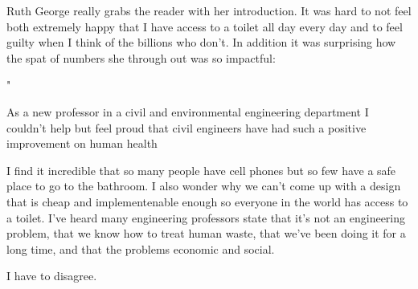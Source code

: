 Ruth George really grabs the reader with her introduction.  It was hard to not feel both extremely happy that I have access to a toilet all day every day and to feel guilty when I think of the billions who don't.  In addition it was surprising how the spat of numbers she through out was so impactful:

	"

As a new professor in a civil and environmental engineering department I couldn't help but feel proud that civil engineers have had such a positive improvement on human health

I find it incredible that so many people have cell phones but so few have a safe place to go to the bathroom. I also wonder why we can't come up with a design that is cheap and implementenable enough so everyone in the world has access to a  toilet.  I've heard many engineering professors state that it's not an engineering problem, that we know how to treat human waste, that we've been doing it for a long time, and that the problems economic and social.

I have to disagree.  

